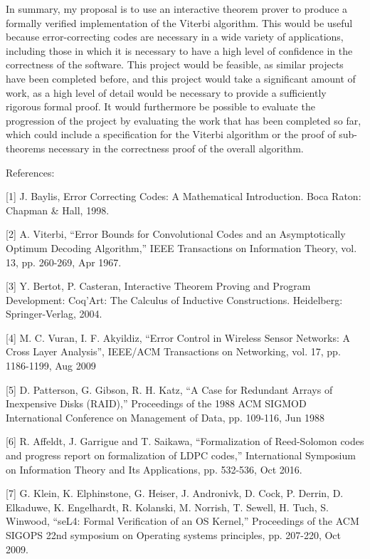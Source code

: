 \documentclass{article}
\begin{document}
In summary, my proposal is to use an interactive theorem prover to produce a formally verified implementation of the Viterbi algorithm. This would be useful because error-correcting codes are necessary in a wide variety of applications, including those in which it is necessary to have a high level of confidence in the correctness of the software. This project would be feasible, as similar projects have been completed before, and this project would take a significant amount of work, as a high level of detail would be necessary to provide a sufficiently rigorous formal proof. It would furthermore be possible to evaluate the progression of the project by evaluating the work that has been completed so far, which could include a specification for the Viterbi algorithm or the proof of sub-theorems necessary in the correctness proof of the overall algorithm.

References:

[1]    J. Baylis, Error Correcting Codes: A Mathematical Introduction. Boca Raton: Chapman \& Hall, 1998.

[2]    A. Viterbi, “Error Bounds for Convolutional Codes and an Asymptotically Optimum Decoding Algorithm,” IEEE Transactions on Information Theory, vol. 13, pp. 260-269, Apr 1967.

[3]    Y. Bertot, P. Casteran, Interactive Theorem Proving and Program Development: Coq’Art: The Calculus of Inductive Constructions. Heidelberg: Springer-Verlag, 2004.

[4]    M. C. Vuran, I. F. Akyildiz, “Error Control in Wireless Sensor Networks: A Cross Layer Analysis”, IEEE/ACM Transactions on Networking, vol. 17, pp. 1186-1199, Aug 2009

[5]    D. Patterson, G. Gibson, R. H. Katz, “A Case for Redundant Arrays of Inexpensive Disks (RAID),” Proceedings of the 1988 ACM SIGMOD International Conference on Management of Data, pp. 109-116, Jun 1988

[6]    R. Affeldt, J. Garrigue and T. Saikawa, “Formalization of Reed-Solomon codes and progress report on formalization of LDPC codes,” International Symposium on Information Theory and Its Applications, pp. 532-536, Oct 2016.

[7]    G. Klein, K. Elphinstone, G. Heiser, J. Andronivk, D. Cock, P. Derrin, D. Elkaduwe, K. Engelhardt, R. Kolanski, M. Norrish, T. Sewell, H. Tuch, S. Winwood, “seL4: Formal Verification of an OS Kernel,” Proceedings of the ACM SIGOPS 22nd symposium on Operating systems principles, pp. 207-220, Oct 2009.
\end{document}
